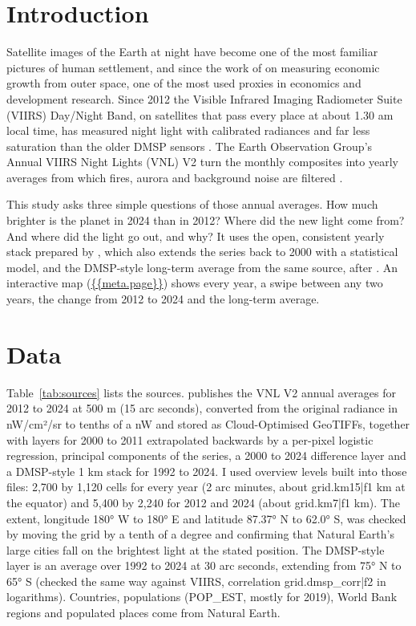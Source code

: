 \documentclass[11pt,a4paper]{article}
\begin{document}
\section{Introduction}
Satellite images of the Earth at night have become one of the most familiar pictures of human settlement, and since the work of \citet{henderson} on measuring economic growth from outer space, one of the most used proxies in economics and development research. Since 2012 the Visible Infrared Imaging Radiometer Suite (VIIRS) Day/Night Band, on satellites that pass every place at about 1.30 am local time, has measured night light with calibrated radiances and far less saturation than the older DMSP sensors \citep{elvidge2017}. The Earth Observation Group's Annual VIIRS Night Lights (VNL) V2 turn the monthly composites into yearly averages from which fires, aurora and background noise are filtered \citep{elvidge2021}.

This study asks three simple questions of those annual averages. How much brighter is the planet in 2024 than in 2012? Where did the new light come from? And where did the light go out, and why? It uses the open, consistent yearly stack prepared by \citet{hengl}, which also extends the series back to 2000 with a statistical model, and the DMSP-style long-term average from the same source, after \citet{li2020}. An interactive map (\url{{{meta.page}}}) shows every year, a swipe between any two years, the change from 2012 to 2024 and the long-term average.

\section{Data}
Table~\ref{tab:sources} lists the sources. \citet{hengl} publishes the VNL V2 annual averages for 2012 to 2024 at 500 m (15 arc seconds), converted from the original radiance in nW/cm²/sr to tenths of a nW and stored as Cloud-Optimised GeoTIFFs, together with layers for 2000 to 2011 extrapolated backwards by a per-pixel logistic regression, principal components of the series, a 2000 to 2024 difference layer and a DMSP-style 1 km stack for 1992 to 2024. I used overview levels built into those files: 2,700 by 1,120 cells for every year (2 arc minutes, about {{grid.km15|f1}} km at the equator) and 5,400 by 2,240 for 2012 and 2024 (about {{grid.km7|f1}} km). The extent, longitude 180° W to 180° E and latitude 87.37° N to 62.0° S, was checked by moving the grid by a tenth of a degree and confirming that Natural Earth's large cities fall on the brightest light at the stated position. The DMSP-style layer is an average over 1992 to 2024 at 30 arc seconds, extending from 75° N to 65° S (checked the same way against VIIRS, correlation {{grid.dmsp_corr|f2}} in logarithms). Countries, populations (POP\_EST, mostly for 2019), World Bank regions and populated places come from Natural Earth.
\end{document}
